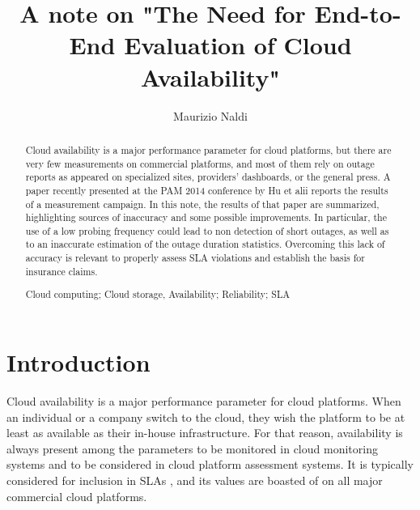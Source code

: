 \documentclass[runningheads,a4paper]{llncs}
\newcommand{\keywords}[1]{\par\addvspace\baselineskip
\noindent\keywordname\enspace\ignorespaces#1}
\begin{document}
\mainmatter  

\title{A note on "The Need for End-to-End Evaluation of Cloud Availability"}


\author{Maurizio Naldi}







\maketitle


\begin{abstract}
Cloud availability is a major performance parameter for cloud platforms, but there are very few measurements on commercial platforms, and most of them rely on outage reports as appeared on specialized sites, providers' dashboards, or the general press. A paper recently presented at the PAM 2014 conference by Hu et alii reports the results of a measurement campaign. In this note, the results of that paper are summarized, highlighting sources of inaccuracy and some possible improvements. In particular, the use of a low probing frequency could lead to non detection of short outages, as well as to an inaccurate estimation of the outage duration statistics. Overcoming this lack of accuracy is relevant to properly assess SLA violations and establish the basis for insurance claims.

\keywords{Cloud computing; Cloud storage, Availability; Reliability; SLA}
\end{abstract}


\section{Introduction}
Cloud availability is a major performance parameter for cloud platforms. When an individual or a company switch to the cloud, they wish the platform to be at least as available as their in-house infrastructure. For that reason, availability is always present among the parameters to be monitored in cloud monitoring systems \cite{montes2013} and to be considered in cloud platform assessment systems\cite{Li-GRID-2012}\cite{CalheirosSPE995}.
It is typically considered for inclusion in SLAs \cite{CuomoJGC2013}\cite{Emeakaroha-FGCS2012}\cite{gillam2012}, and its values are boasted of on all major commercial cloud platforms. 
\end{document}
